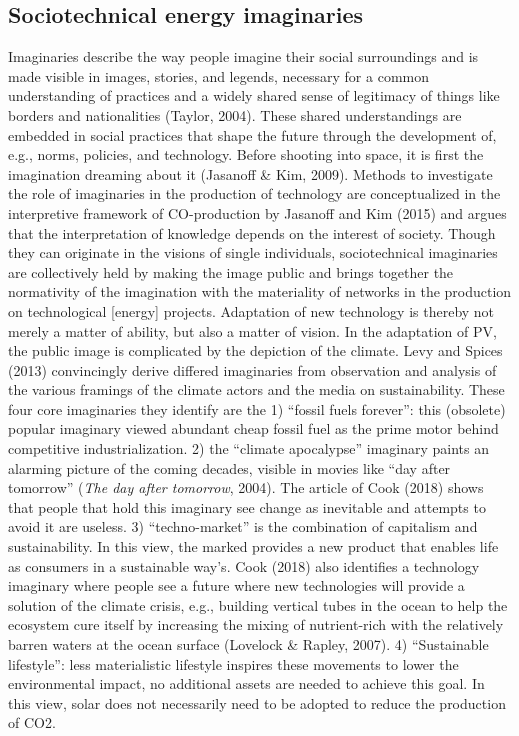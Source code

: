 \documentclass[man,floatsintext]{apa6}
\begin{document}
\subsection{Sociotechnical energy
imaginaries}\label{sociotechnical-energy-imaginaries}

Imaginaries describe the way people imagine their social surroundings
and is made visible in images, stories, and legends, necessary for a
common understanding of practices and a widely shared sense of
legitimacy of things like borders and nationalities (Taylor, 2004).
These shared understandings are embedded in social practices that shape
the future through the development of, e.g., norms, policies, and
technology. Before shooting into space, it is first the imagination
dreaming about it (Jasanoff \& Kim, 2009). Methods to investigate the
role of imaginaries in the production of technology are conceptualized
in the interpretive framework of CO-production by Jasanoff and Kim
(2015) and argues that the interpretation of knowledge depends on the
interest of society. Though they can originate in the visions of single
individuals, sociotechnical imaginaries are collectively held by making
the image public and brings together the normativity of the imagination
with the materiality of networks in the production on technological
{[}energy{]} projects. Adaptation of new technology is thereby not
merely a matter of ability, but also a matter of vision. In the
adaptation of PV, the public image is complicated by the depiction of
the climate. Levy and Spices (2013) convincingly derive differed
imaginaries from observation and analysis of the various framings of the
climate actors and the media on sustainability. These four core
imaginaries they identify are the 1) \enquote{fossil fuels forever}:
this (obsolete) popular imaginary viewed abundant cheap fossil fuel as
the prime motor behind competitive industrialization. 2) the
\enquote{climate apocalypse} imaginary paints an alarming picture of the
coming decades, visible in movies like \enquote{day after tomorrow}
(\emph{The day after tomorrow}, 2004). The article of Cook (2018) shows
that people that hold this imaginary see change as inevitable and
attempts to avoid it are useless. 3) \enquote{techno-market} is the
combination of capitalism and sustainability. In this view, the marked
provides a new product that enables life as consumers in a sustainable
way's. Cook (2018) also identifies a technology imaginary where people
see a future where new technologies will provide a solution of the
climate crisis, e.g., building vertical tubes in the ocean to help the
ecosystem cure itself by increasing the mixing of nutrient-rich with the
relatively barren waters at the ocean surface (Lovelock \& Rapley,
2007). 4) \enquote{Sustainable lifestyle}: less materialistic lifestyle
inspires these movements to lower the environmental impact, no
additional assets are needed to achieve this goal. In this view, solar
does not necessarily need to be adopted to reduce the production of CO2.
\end{document}
